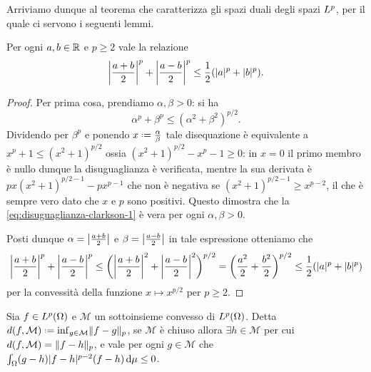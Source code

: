 Arriviamo dunque al teorema che caratterizza gli spazi duali degli spazi $\lclass[p]$, per il quale ci servono i seguenti lemmi.
\begin{lemma} \label{l:disuguaglianza-clarkson}
    Per ogni $a,b\in\R$ e $p\ge 2$ vale la relazione
    \begin{equation}
        \abs[\bigg]{\frac{a+b}2}^p+\abs[\bigg]{\frac{a-b}2}^p \le \frac12(\abs{a}^p+\abs{b}^p).
        \label{eq:disuguaglianza-clarkson}
    \end{equation}
\end{lemma}
\begin{proof}
    Per prima cosa, prendiamo $\alpha,\beta>0$: si ha
    \begin{equation}
        \alpha^p+\beta^p\le(\alpha^2+\beta^2)^{p/2}.
        \label{eq:disuguaglianza-clarkson-1}
    \end{equation}
    Dividendo per $\beta^p$ e ponendo $x\defeq\frac{\alpha}{\beta}$ tale disequazione è equivalente a $x^p+1\le(x^2+1)^{p/2}$ ossia $(x^2+1)^{p/2}-x^p-1\ge 0$: in $x=0$ il primo membro è nullo dunque la disuguaglianza è verificata, mentre la sua derivata è $px(x^2+1)^{p/2-1}-px^{p-1}$ che non è negativa se $(x^2+1)^{p/2-1}\ge x^{p-2}$, il che è sempre vero dato che $x$ e $p$ sono positivi.
    Questo dimostra che la \eqref{eq:disuguaglianza-clarkson-1} è vera per ogni $\alpha,\beta>0$.

    Posti dunque $\alpha=\abs[\big]{\frac{a+b}2}$ e $\beta=\abs[\big]{\frac{a-b}2}$ in tale espressione otteniamo che
    \begin{equation}
        \abs[\bigg]{\frac{a+b}2}^p+\abs[\bigg]{\frac{a-b}2}^p\le
        \biggl(\abs[\bigg]{\frac{a+b}2}^2+\abs[\bigg]{\frac{a-b}2}^2\biggr)^{p/2}=
        \biggl(\frac{a^2}2+\frac{b^2}2\biggr)^{p/2}\le
        \frac12(\abs{a}^p+\abs{b}^p)
    \end{equation}
    per la convessità della funzione $x\mapsto x^{p/2}$ per $p\ge 2$.
\end{proof}
\begin{lemma}
    Sia $f\in\leb[p]{\Omega}$ e $\mathcal{M}$ un sottoinsieme convesso di $\leb[p]{\Omega}$.
    Detta $d(f,\mathcal{M})\defeq\inf_{g\in\mathcal{M}}\norm{f-g}_p$, se $\mathcal{M}$ è chiuso allora $\exists h\in\mathcal{M}$ per cui $d(f,\mathcal{M})=\norm{f-h}_p$, e vale per ogni $g\in\mathcal{M}$ che $\int_\Omega (g-h)\abs{f-h}^{p-2}(f-h)\,\dd\mu\le 0$.
\end{lemma}
